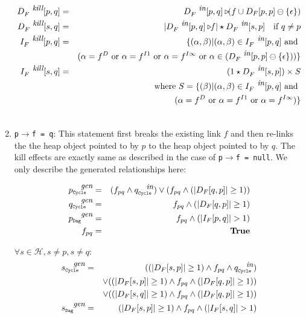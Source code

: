 \documentclass[runningheads,a4paper]{llncs}
\newcommand{\p}{\ensuremath{p}}
\newcommand{\q}{\ensuremath{q}}
\newcommand{\s}{\ensuremath{s}}
\newcommand{\drct}{\ensuremath{D}}
\newcommand{\indrct}{\ensuremath{I}}
\newcommand{\heap}{\ensuremath{\mathcal{H}}}
\newcommand{\subC}{\mbox{\scalebox{.6}{\Cycle}}}
\newcommand{\subD}{\mbox{\scalebox{.6}{\Dag}}}
\newcommand{\epsilonset}{\ensuremath{\{\epsilon\}}}
\newcommand{\din}{\mbox{\footnotesize\em in}}
\newcommand{\dkill}{\mbox{\footnotesize\em kill}}
\newcommand{\dgen}{\mbox{\footnotesize\em gen}}
\newcommand{\GenC}[1]{\ensuremath{{#1}_{\subC}^{\dgen}}}
\newcommand{\GenD}[1]{\ensuremath{{#1}_{\subD}^{\dgen}}}
\newcommand{\InC}[1]{\ensuremath{{#1}_{\subC}^{\din}}}
\newcommand{\project}[2]{\ensuremath{#1\triangleright\!\!#2}}
\newcommand{\num}[1]{\ensuremath{|#1|}}
\newcommand{\remOne}[2]{\ensuremath{#1 \ominus #2}}
\newcommand{\DFM}[2]{\ensuremath{D_F[#1,#2]}}
\newcommand{\IFM}[2]{\ensuremath{I_F[#1,#2]}}
\newcommand{\Dag}{{\tt Dag}}
\newcommand{\Cycle}{{\tt Cycle}}
\newcommand{\fieldD}[2]{\ensuremath{{#1}_{#2}^\drct}}
\newcommand{\fieldI}[3]{\ensuremath{{#1}_{#2}^{\indrct#3}}}
\newcommand{\true}{\textbf{True}}
\begin{document}
\begin{enumerate}
{\green 
\begin{eqnarray*}
  	D_F^{\dkill}[\p,\q]  &=&  \project{D_F^{\din}[\p,\q]}{(f \cup \remOne{\DFM{p}{p}}{\epsilonset})}  \\	
  	D_F^{\dkill}[\s,\q]  &=& \num{\project{D_F^{\din}[\p,\q]}{f}} \star D_F^{\din}[\s,\p] \quad \mbox{if } \q \not= \p 	\\
  	I_F^{\dkill}[\p,\q]    &=& \{(\alpha, \beta) \vert (\alpha, \beta) \in I_F^{\din}[\p, \q] \mbox{ and } \\
  						&& (\alpha = \fieldD{f}{} \mbox{ or } \alpha = \fieldI{f}{}{1} \mbox{ or } \alpha = f^{\indrct\infty} \mbox{ or } 
							\alpha \in (\remOne{D_F^{\din}[\p, \p]}{\epsilonset}))\} \\
  	I_F^{\dkill}[\s,\q]    &=& (1 \star D_F^{\din}[\s, \p]) \times S \\ 
						&& \mbox{where } S = \{(\beta) \vert (\alpha, \beta) \in I_F^{\din}[\p, \q] \mbox{ and } \\
  						&& (\alpha = \fieldD{f}{} \mbox{ or } \alpha = \fieldI{f}{}{1} \mbox{ or } \alpha = f^{\indrct\infty})\} \\
  \rule{0mm}{0pt}
\end{eqnarray*}
}
\item {\tt p$\rightarrow$f = q}: This statement first breaks
  the existing link $f$ and then re-links the the heap object
  pointed to by $\p$ to the heap object pointed to by
  $\q$. The kill effects are exactly same as described in the
  case of  {\tt p$\rightarrow$f = null}. We only describe the
  generated relationships here:

  \begin{eqnarray*}
	\GenC{p}   &= & (f_{\p\q} \wedge \InC{q}) \vee (f_{\p\q} \wedge (\num{\DFM{\q}{\p}} \geq 1)) \\
	\GenC{q}   &= & f_{\p\q} \wedge (\num{\DFM{\q}{\p}} \geq 1) \\
	\GenD{p}   &= & f_{\p\q} \wedge (\num{\IFM{\p}{\q}} > 1)	\\
        f_{\p\q} &=& \true
  \end{eqnarray*}

$\forall \s \in \heap, \s \not= \p, \s \not=\q$:
  \begin{eqnarray*}
    \GenC{\s} &=& ((\num{\DFM{\s}{\p}} \geq 1) \wedge f_{\p\q} \wedge \InC{q}) \\
    && \vee 	  ((\num{\DFM{\s}{\p}} \geq 1) \wedge f_{\p\q} \wedge (\num{\DFM{\q}{\p}} \geq 1)) \\
    && \vee       ((\num{\DFM{\s}{\q}} \geq 1) \wedge f_{\p\q} \wedge (\num{\DFM{\q}{\p}} \geq 1)) \\
    \GenD{\s}   &=& (\num{\DFM{\s}{\p}} \geq 1) \wedge  f_{\p\q} \wedge (\num{\IFM{\s}{\q}} > 1)
  \end{eqnarray*}


\end{enumerate}
\end{document}
